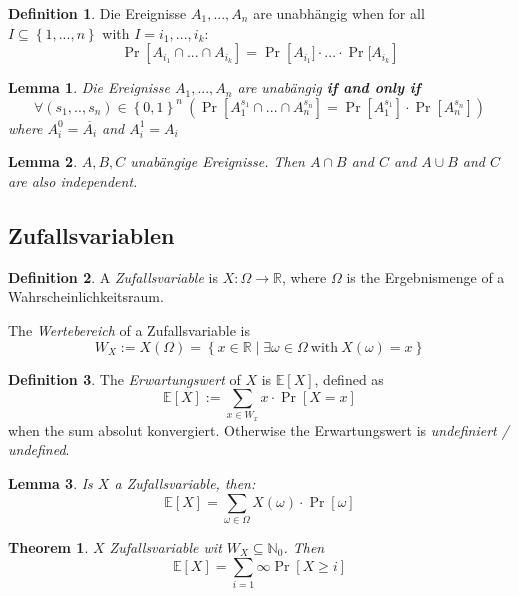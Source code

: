 \documentclass[12pt]{extarticle}
\theoremstyle{definition}
\newtheorem{definition}{Definition}
\theoremstyle{remark}
\theoremstyle{plain}
\newtheorem{theorem}{Theorem}
\theoremstyle{plain}
\newtheorem{lemma}{Lemma}
\theoremstyle{plain}
\newcommand{\E}{\mathbb{E}}
\begin{document}
\begin{definition}
    Die Ereignisse $A_1, ..., A_n$ are unabhängig when for all $I \subseteq \left\{ 1, ..., n \right\}$
    with $I = {i_1, ..., i_k}$:
    \[ \Pr \left[ A_{i_1} \cap ... \cap A_{i_k} \right] = \Pr \left[ A_{i_1}] \cdot ... \cdot \Pr[A_{i_k} \right] \]
\end{definition}

\begin{lemma}
    Die Ereignisse $A_1, ..., A_n$ are unabängig \textbf{if and only if}
    \[ \forall (s_1, .., s_n) \in \left\{ 0, 1 \right\}^n\ \left( \Pr[A_1^{s_1} \cap ... \cap A_n^{s_n}] = \Pr[A_1^{s_1}] \cdot \Pr[A_n^{s_n}] \right) \]
    where $A_i^0 = \overline{A_i}$ and $A_i^1 = A_i$
\end{lemma}

\begin{lemma}
    $A, B, C$ unabängige Ereignisse.
    Then $A \cap B$ and $C$ and $A \cup B$ and $C$ are also independent.
\end{lemma}

\subsection{Zufallsvariablen}

\begin{definition}
    A \textit{Zufallsvariable} is $X:\Omega \to \mathbb{R}$,
    where $\Omega$ is the Ergebnismenge of a Wahrscheinlichkeitsraum.

    The \textit{Wertebereich} of a Zufallsvariable is
    \[ W_X := X(\Omega) = \left\{ x \in \mathbb{R} \mid \exists \omega \in \Omega\ \mbox{with}\ X(\omega) = x \right\} \]
\end{definition}

\begin{definition}
    The \textit{Erwartungswert} of $X$ is $\E[X]$, defined as
    \[ \E[X] := \sum_{x \in W_x} x \cdot \Pr[X = x] \]
    when the sum absolut konvergiert. Otherwise the Erwartungswert is \textit{undefiniert / undefined}.
\end{definition}

\begin{lemma}
    Is $X$ a Zufallsvariable, then:
    \[ \E[X] = \sum_{\omega \in \Omega} X(\omega) \cdot \Pr[\omega] \]
\end{lemma}

\begin{theorem}
    $X$ Zufallsvariable wit $W_X \subseteq \mathbb{N}_0$. Then
    \[ \E[X] = \sum_{i=1}\infty \Pr[X \ge i] \]
\end{theorem}
\end{document}
